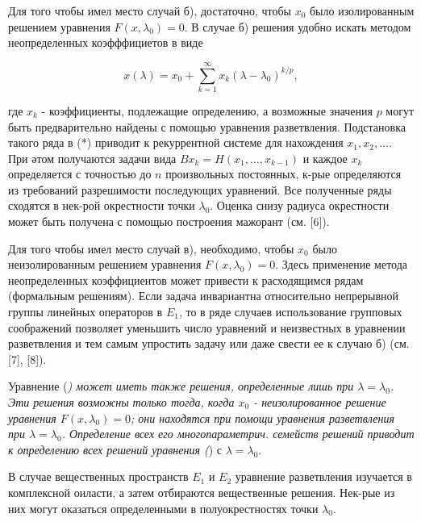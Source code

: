 \documentclass[10pt]{article}
\begin{document}
Для того чтобы имел место случай б), достаточно, чтобы $x_{0}$ было изолированным решением уравнения $F\left(x, \lambda_{0}\right)=0$. В случае б) решения удобно искать методом неопределенных коэфффициетов в виде



\[

x(\lambda)=x_{0}+\sum_{k=1}^{\infty} x_{k}\left(\lambda-\lambda_{0}\right)^{k / p},

\]



где $x_{k}$ - коэффициенты, подлежащие определению, а возможные значения $p$ могут быть предварительно найдены с помощью уравнения разветвления. Подстановка такого ряда в (*) приводит к рекуррентной системе для нахождения $x_{1}, x_{2}, \ldots$. При әтом получаются задачи вида $B x_{k}=H\left(x_{1}, \ldots, x_{k-1}\right)$ и каждое $x_{k}$ определяется с точностью до $n$ произвольных постоянных, к-рые определяются из требований разрешимости последующих уравнений. Все полученные ряды сходятся в нек-рой окрестности точки $\lambda_{0}$. Оценка снизу радиуса окрестности может быть получена с помощью построения мажорант (см. [6]).



Для того чтобы имел место случай в), необходимо, чтобы $x_{0}$ было неизолированным решением уравнения $F\left(x, \lambda_{0}\right)=0$. Здесь применение метода неопределенных коэффициентов может привести к расходящимся рядам (формальным решениям). Если задача инвариантна относительно непрерывной группы линейных операторов в $E_{1}$, то в ряде случаев использование групповых соображений позволяет уменьшить число уравнений и неизвестных в уравнении разветвления и тем самым упростить задачу или даже свести ее к случаю б) (см. [7], [8]).



Уравнение (\textit{) может иметь также решения, определенные лишь при $\lambda=\lambda_{0}$. Эти решения возможны только тогда, когда $x_{0}$ - неизолированное решение уравнения $F\left(x, \lambda_{0}\right)=0$; они находятся при помощи уравнения разветвления при $\lambda=\lambda_{0}$. Определение всех его многопараметрич. семейств решений приводит к определению всех решений уравнения (}) с $\lambda=\lambda_{0}$.



В случае вещественных пространств $E_{1}$ и $E_{2}$ уравнение разветвления изучается в комплексной оиласти, а затем отбираются вещественные решения. Нек-рые из них могут оказаться определенными в полуокрестностях точки $\lambda_{0}$.
\end{document}
